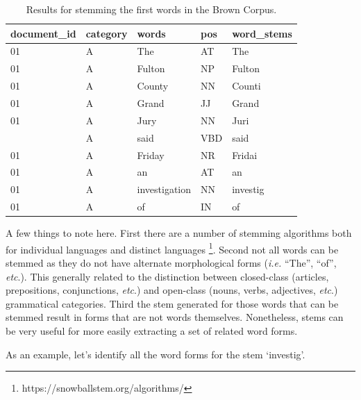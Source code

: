 \documentclass[
  letterpaper,
]{scrbook}
\begin{document}
\hypertarget{tbl-recoding-stemming-brown-example}{}
\begin{table}
\caption{\label{tbl-recoding-stemming-brown-example}Results for stemming the first words in the Brown Corpus. }\tabularnewline

\centering
\begin{tabular}{lllll}
\toprule
document\_id & category & words & pos & word\_stems\\
\midrule
01 & A & The & AT & The\\
01 & A & Fulton & NP & Fulton\\
01 & A & County & NN & Counti\\
01 & A & Grand & JJ & Grand\\
01 & A & Jury & NN & Juri\\
\addlinespace
01 & A & said & VBD & said\\
01 & A & Friday & NR & Fridai\\
01 & A & an & AT & an\\
01 & A & investigation & NN & investig\\
01 & A & of & IN & of\\
\bottomrule
\end{tabular}
\end{table}

A few things to note here. First there are a number of stemming
algorithms both for individual languages and distinct languages
\footnote{https://snowballstem.org/algorithms/}. Second not all words
can be stemmed as they do not have alternate morphological forms
(\emph{i.e.} ``The'', ``of'', \emph{etc}.). This generally related to
the distinction between closed-class (articles, prepositions,
conjunctions, \emph{etc}.) and open-class (nouns, verbs, adjectives,
\emph{etc}.) grammatical categories. Third the stem generated for those
words that can be stemmed result in forms that are not words themselves.
Nonetheless, stems can be very useful for more easily extracting a set
of related word forms.

As an example, let's identify all the word forms for the stem
`investig'.
\end{document}
